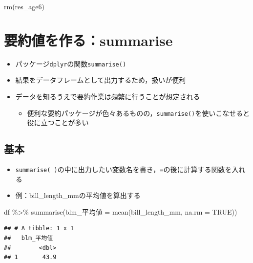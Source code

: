 \documentclass[
  xelatex,ja=standard, b5paper]{bxjsbook}
\newenvironment{Shaded}{\begin{snugshade}}{\end{snugshade}}
\newcommand{\AttributeTok}[1]{\textcolor[rgb]{0.77,0.63,0.00}{#1}}
\newcommand{\ConstantTok}[1]{\textcolor[rgb]{0.00,0.00,0.00}{#1}}
\newcommand{\FunctionTok}[1]{\textcolor[rgb]{0.00,0.00,0.00}{#1}}
\newcommand{\NormalTok}[1]{#1}
\newcommand{\OtherTok}[1]{\textcolor[rgb]{0.56,0.35,0.01}{#1}}
\newcommand{\SpecialCharTok}[1]{\textcolor[rgb]{0.00,0.00,0.00}{#1}}
\providecommand{\tightlist}{%
  \setlength{\itemsep}{0pt}\setlength{\parskip}{0pt}}
\begin{document}
\begin{Shaded}
\begin{Highlighting}[]
\FunctionTok{rm}\NormalTok{(res\_age6)}
\end{Highlighting}
\end{Shaded}

\hypertarget{summarise}{%
\chapter{要約値を作る：summarise}\label{summarise}}

\begin{itemize}
\tightlist
\item
  パッケージ\texttt{dplyr}の関数\texttt{summarise()}
\item
  結果をデータフレームとして出力するため，扱いが便利
\item
  データを知るうえで要約作業は頻繁に行うことが想定される

  \begin{itemize}
  \tightlist
  \item
    便利な要約パッケージが色々あるものの，\texttt{summarise()}を使いこなせると役に立つことが多い
  \end{itemize}
\end{itemize}

\hypertarget{su-st}{%
\section{基本}\label{su-st}}

\begin{itemize}
\tightlist
\item
  \texttt{summarise(\ )}の中に出力したい変数名を書き，\texttt{=}の後に計算する関数を入れる
\item
  例：bill\_length\_mmの平均値を算出する
\end{itemize}

\begin{Shaded}
\begin{Highlighting}[]
\NormalTok{df }\SpecialCharTok{\%\textgreater{}\%} 
  \FunctionTok{summarise}\NormalTok{(blm\_平均値 }\OtherTok{=} \FunctionTok{mean}\NormalTok{(bill\_length\_mm, }\AttributeTok{na.rm =} \ConstantTok{TRUE}\NormalTok{))}
\end{Highlighting}
\end{Shaded}

\begin{verbatim}
## # A tibble: 1 x 1
##   blm_平均値
##        <dbl>
## 1       43.9
\end{verbatim}
\end{document}
